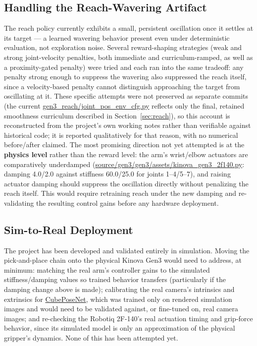 \documentclass[11pt]{article}
\begin{document}
\subsection{Handling the Reach-Wavering Artifact}

The reach policy currently exhibits a small, persistent oscillation once it
settles at its target --- a learned wavering behavior present even under
deterministic evaluation, not exploration noise. Several reward-shaping
strategies (weak and strong joint-velocity penalties, both immediate and
curriculum-ramped, as well as a proximity-gated penalty) were tried and each ran
into the same tradeoff: any penalty strong enough to suppress the wavering also
suppressed the reach itself, since a velocity-based penalty cannot distinguish
approaching the target from oscillating at it. These specific attempts were not
preserved as separate commits (the current
\url{gen3_reach/joint_pos_env_cfg.py} reflects only the final, retained
smoothness curriculum described in Section~\ref{sec:reach}), so this account is
reconstructed from the project's own working notes rather than verifiable against
historical code; it is reported qualitatively for that reason, with no numerical
before/after claimed. The most promising direction not
yet attempted is at the \textbf{physics level} rather than the reward level: the
arm's wrist/elbow actuators are comparatively underdamped
(\url{source/gen3/gen3/assets/kinova_gen3_2f140.py}: damping 4.0/2.0 against
stiffness 60.0/25.0 for joints 1--4/5--7), and raising actuator damping should suppress the oscillation
directly without penalizing the reach itself. This would require retraining
reach under the new damping and re-validating the resulting control gains before
any hardware deployment.

\subsection{Sim-to-Real Deployment}

The project has been developed and validated entirely in simulation. Moving the
pick-and-place chain onto the physical Kinova Gen3 would need to address, at
minimum: matching the real arm's controller gains to the simulated
stiffness/damping values so trained behavior transfers (particularly if the
damping change above is made); calibrating the real camera's intrinsics and
extrinsics for \url{CubePoseNet}, which was trained only on rendered
simulation images and would need to be validated against, or fine-tuned on, real
camera images; and re-checking the Robotiq 2F-140's real actuation timing and
grip-force behavior, since its simulated model is only an approximation of the
physical gripper's dynamics. None of this has been attempted yet.
\end{document}
